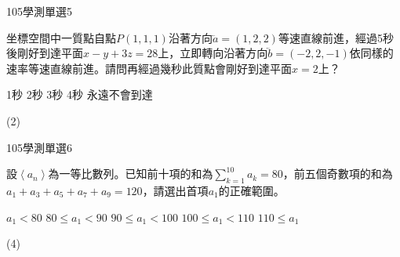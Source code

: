     \begin{QUESTION}
        \begin{ExamInfo}{105}{學測}{單選}{5}
        \end{ExamInfo}
        \begin{ExamAnsRateInfo}{52}{86}{49}{21}
        \end{ExamAnsRateInfo}
        \begin{QBODY}
            坐標空間中一質點自點$P(1,1,1)$沿著方向$\lvec{a}=(1,2,2)$等速直線前進，經過5秒後剛好到達平面$x-y+3z=28$上，立即轉向沿著方向$\lvec{b}=(-2,2,-1)$依同樣的速率等速直線前進。請問再經過幾秒此質點會剛好到達平面$x=2$上？
			\begin{QOPS}
				\QOP 1秒
				\QOP 2秒
				\QOP 3秒
				\QOP 4秒
				\QOP 永遠不會到達
			\end{QOPS}
        \end{QBODY}
        \begin{QFROMS}
        \end{QFROMS}
        \begin{QTAGS}\end{QTAGS}
        \begin{QANS}
            (2)
        \end{QANS}
        \begin{QSOLLIST}
        \end{QSOLLIST}
        \begin{QEMPTYSPACE}
        \end{QEMPTYSPACE}
    \end{QUESTION}
    \begin{QUESTION}
        \begin{ExamInfo}{105}{學測}{單選}{6}
        \end{ExamInfo}
        \begin{ExamAnsRateInfo}{28}{53}{22}{9}
        \end{ExamAnsRateInfo}
        \begin{QBODY}
            設$\left\langle {{a}_{n}} \right\rangle $為一等比數列。已知前十項的和為$\sum\limits_{k=1}^{10}{{{a}_{k}}}=80$，前五個奇數項的和為${{a}_{1}}+{{a}_{3}}+{{a}_{5}}+{{a}_{7}}+{{a}_{9}}=120$，請選出首項${{a}_{1}}$的正確範圍。
			\begin{QOPS}
				\QOP ${{a}_{1}}<80$
				\QOP $80\le {{a}_{1}}<90$
				\QOP $90\le {{a}_{1}}<100$
				\QOP $100\le {{a}_{1}}<110$
				\QOP $110\le {{a}_{1}}$
			\end{QOPS}
        \end{QBODY}
        \begin{QFROMS}
        \end{QFROMS}
        \begin{QTAGS}\end{QTAGS}
        \begin{QANS}
            (4)
        \end{QANS}
        \begin{QSOLLIST}
        \end{QSOLLIST}
        \begin{QEMPTYSPACE}
        \end{QEMPTYSPACE}
    \end{QUESTION}
